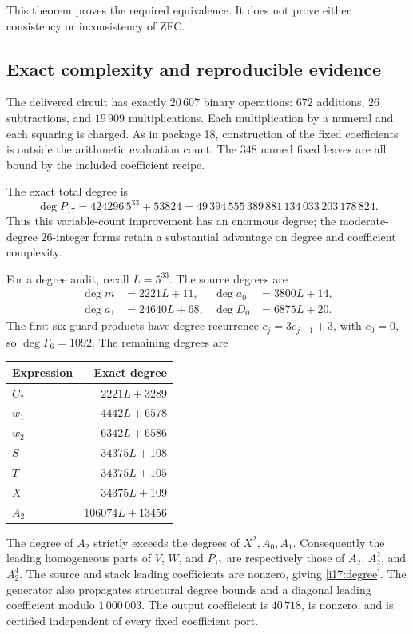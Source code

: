 This theorem proves the required equivalence. It does not prove either
consistency or inconsistency of ZFC.

\subsection{Exact complexity and reproducible evidence}

The delivered circuit has exactly $20\,607$ binary operations:
$672$ additions, $26$ subtractions, and $19\,909$ multiplications.
Each multiplication by a numeral and each squaring is charged.
As in package 18, construction of the fixed coefficients is outside
the arithmetic evaluation count. The $348$ named fixed leaves are all
bound by the included coefficient recipe.

The exact total degree is
\begin{equation}
 \deg P_{17}=424296\,5^{33}+53824
 =49\,394\,555\,389\,881\,134\,033\,203\,178\,824.
 \label{i17:degree}
\end{equation}
Thus this variable-count improvement has an enormous degree; the
moderate-degree $26$-integer forms retain a substantial advantage on
degree and coefficient complexity.

For a degree audit, recall $L=5^{33}$. The source degrees are
\begin{align*}
 \deg m&=2221L+11,&\deg a_0&=3800L+14,\\
 \deg a_1&=24640L+68,&\deg D_0&=6875L+20.
\end{align*}
The first six guard products have degree recurrence
$c_j=3c_{j-1}+3$, with $c_0=0$, so
$\deg\Gamma_6=1092$. The remaining degrees are
\begin{center}
\begin{tabular}{@{}lr@{}}
\toprule
Expression & Exact degree\\
\midrule
$C_\ast$ & $2221L+3289$\\
$w_1$ & $4442L+6578$\\
$w_2$ & $6342L+6586$\\
$S$ & $34375L+108$\\
$T$ & $34375L+105$\\
$X$ & $34375L+109$\\
$A_2$ & $106074L+13456$\\
\bottomrule
\end{tabular}
\end{center}
The degree of $A_2$ strictly exceeds the degrees of $X^2,A_0,A_1$.
Consequently the leading homogeneous parts of $V$, $W$, and $P_{17}$
are respectively those of $A_2$, $A_2^2$, and $A_2^4$.
The source and stack leading coefficients are nonzero, giving
\eqref{i17:degree}. The generator also propagates structural degree
bounds and a diagonal leading coefficient modulo $1\,000\,003$.
The output coefficient is $40\,718$, is nonzero, and is certified
independent of every fixed coefficient port.

